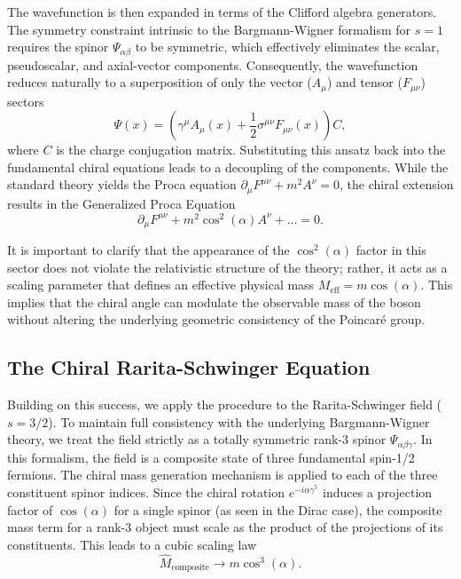 The wavefunction is then expanded in terms of the Clifford algebra generators.
The symmetry constraint intrinsic to the Bargmann-Wigner formalism for $s=1$
requires the spinor $\Psi_{\alpha\beta}$ to be symmetric, which effectively
eliminates the scalar, pseudoscalar, and axial-vector components. Consequently,
the wavefunction reduces naturally to a superposition of only the vector
($A_\mu$) and tensor ($F_{\mu\nu}$) sectors
\begin{equation}
  \Psi(x) = \left( \gamma^\mu A_\mu(x) + \frac{1}{2}\sigma^{\mu\nu}
  F_{\mu\nu}(x) \right) C,
\end{equation}
where $C$ is the charge conjugation matrix. Substituting this ansatz back into
the fundamental chiral equations leads to a decoupling of the components. While
the standard theory yields the Proca equation $\partial_\mu F^{\mu\nu} + m^2
A^\nu = 0$, the chiral extension results in the Generalized Proca Equation
\begin{equation}
  \partial_\mu F^{\mu\nu} + m^2 \cos^2\left(\alpha\right) A^\nu + \dots = 0.
\end{equation}

It is important to clarify that the appearance of the $\cos^2\left(\alpha\right)$
factor in this sector does not violate the relativistic structure of the theory;
rather, it acts as a scaling parameter that defines an effective physical mass
$M_{\text{eff}} = m \cos\left(\alpha\right)$. This implies that the chiral angle
can modulate the observable mass of the boson without altering the underlying
geometric consistency of the Poincar\'{e} group.

\subsection{The Chiral Rarita-Schwinger Equation}

Building on this success, we apply the procedure to the Rarita-Schwinger field
($s=3/2$). To maintain full consistency with the underlying Bargmann-Wigner
theory, we treat the field strictly as a totally symmetric rank-3 spinor
$\Psi_{\alpha\beta\gamma}$. In this formalism, the field is a composite state of
three fundamental spin-1/2 fermions. The chiral mass generation mechanism is
applied to each of the three constituent spinor indices. Since the chiral
rotation $e^{-i\alpha\gamma^5}$ induces a projection factor of
$\cos\left(\alpha\right)$ for a single spinor (as seen in the Dirac case), the
composite mass term for a rank-3 object must scale as the product of the
projections of its constituents. This leads to a cubic scaling law
\begin{equation}
  \hat{M}_{\text{composite}} \rightarrow m \cos^3\left(\alpha\right).
\end{equation}

